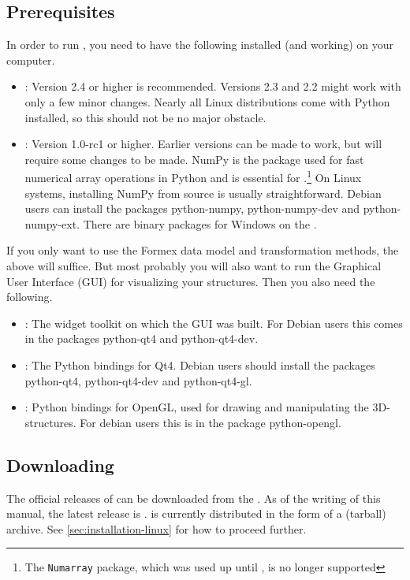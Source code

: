 \subsection{Prerequisites}
\label{sec:prerequisites}
In order to run \pyformex, you need to have the following installed (and working) on your computer.
\begin{itemize}
\item {}: Version 2.4 or higher is recommended. Versions 2.3 and 2.2 might work with only a few minor changes.
Nearly all Linux distributions come with Python installed, so this should not be no major obstacle.
\item {}: Version 1.0-rc1 or higher. Earlier versions can be made to work, but will require some changes to be made. NumPy is the package used for fast numerical array operations in Python and is essential for \pyformex.\footnote{The \texttt{Numarray} package, which was used up until , is no longer supported }
On Linux systems, installing NumPy from source is usually straightforward. Debian users can install the packages python-numpy, python-numpy-dev and python-numpy-ext. There are binary packages for Windows on the .
\end{itemize}
If you only want to use the Formex data model and transformation methods, the above will suffice. But most probably you will also want to run the \pyformex Graphical User Interface (GUI) for visualizing your structures. Then you also need the following. 
\begin{itemize}
\item {}: The widget toolkit on which the GUI was built. For Debian users this  comes in the packages python-qt4 and python-qt4-dev.
\item {}: The Python bindings for Qt4. Debian users should install the packages python-qt4, python-qt4-dev and python-qt4-gl.
\item {}: Python bindings for OpenGL, used for drawing and manipulating the 3D-structures. For debian users this is in the package python-opengl.
\end{itemize}



\subsection{Downloading}
\label{sec:downloading}
The official releases of \pyformex can be downloaded from the 
. As of the writing of this manual, the latest release is \htmladdnormallinkfoot{\pyfversion}{\latestpyf}. 
\pyformex is currently distributed in the form of a  (tarball) archive. See \ref{sec:installation-linux} for how to proceed further.

